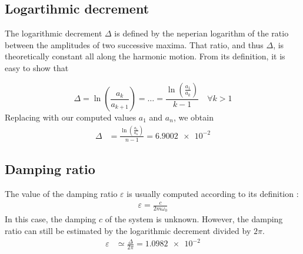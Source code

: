 \documentclass[a4paper, 12pt]{article}
\begin{document}
	\subsection{Logartihmic decrement}
	The logarithmic decrement $\Delta$ is defined by the neperian logarithm of the ratio between the amplitudes of two successive maxima. That ratio, and thus $\Delta$, is theoretically constant all along the harmonic motion. From its definition, it is easy to show that

	\begin{equation*}
		\Delta = \ln \left(\frac{a_k}{a_{k+1}}\right) = \ldots = \frac{ \ln \left(\frac{a_1}{a_k} \right) }{k - 1} \quad \forall k > 1
	\end{equation*}
	Replacing with our computed values $a_1$ and $a_n$, we obtain
	\begin{align*}
		\Delta & = \frac{ \ln \left(\frac{a_1}{a_n} \right) }{n - 1} = \num{6.9002e-2}
	\end{align*}
	\subsection{Damping ratio}
	The value of the damping ratio $\varepsilon$ is usually computed according to its definition :
	\begin{align*}
		\varepsilon = \frac{c}{2 m \omega_0}
	\end{align*}
	In this case, the damping $c$ of the system is unknown. However, the damping ratio can still be estimated by the logarithmic decrement divided by $2 \pi$.
	\begin{align*}
		\varepsilon & \simeq \frac{\Delta}{2 \pi} = \num{1.0982e-2}
	\end{align*}
	\setcounter{section}{4}
\end{document}
